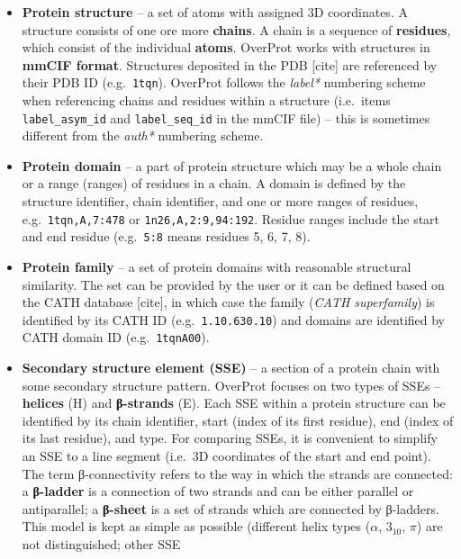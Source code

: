 \documentclass[12pt,draft]{article}
\let\oldtexttt\texttt
\renewcommand{\texttt}[1]{\textcolor{CodeColor}{\oldtexttt{#1}}}
\begin{document}
\begin{itemize}
\item
  \textbf{Protein structure} -- a set of atoms with assigned 3D
  coordinates. A structure consists of one ore more \textbf{chains}. A
  chain is a sequence of \textbf{residues}, which consist of the
  individual \textbf{atoms}. OverProt works with structures in
  \textbf{mmCIF format}. Structures deposited in the PDB {[}cite{]} are
  referenced by their PDB ID (e.g.~\texttt{1tqn}). OverProt follows the
  \emph{label*} numbering scheme when referencing chains and residues
  within a structure (i.e.~items \texttt{label\_asym\_id} and
  \texttt{label\_seq\_id} in the mmCIF file) -- this is sometimes
  different from the \emph{auth*} numbering scheme.
\item
  \textbf{Protein domain} -- a part of protein structure which may be a
  whole chain or a range (ranges) of residues in a chain. A domain is
  defined by the structure identifier, chain identifier, and one or more
  ranges of residues, e.g.~\texttt{1tqn,A,7:478} or
  \texttt{1n26,A,2:9,94:192}. Residue ranges include the start and end
  residue (e.g.~\texttt{5:8} means residues 5, 6, 7, 8).
\item
  \textbf{Protein family} -- a set of protein domains with reasonable
  structural similarity. The set can be provided by the user or it can
  be defined based on the CATH database {[}cite{]}, in which case the
  family (\emph{CATH superfamily}) is identified by its CATH ID
  (e.g.~\texttt{1.10.630.10}) and domains are identified by CATH domain
  ID (e.g.~\texttt{1tqnA00}).
\item
  \textbf{Secondary structure element (SSE)} -- a section of a protein
  chain with some secondary structure pattern. OverProt focuses on two
  types of SSEs -- \textbf{helices} (H) and \textbf{β-strands} (E). Each
  SSE within a protein structure can be identified by its chain
  identifier, start (index of its first residue), end (index of its last
  residue), and type. For comparing SSEs, it is convenient to simplify
  an SSE to a line segment (i.e.~3D coordinates of the start and end
  point).\\
  The term β-connectivity refers to the way in which the strands are
  connected: a \textbf{β-ladder} is a connection of two strands and can
  be either parallel or antiparallel; a \textbf{β-sheet} is a set of
  strands which are connected by β-ladders.\\
  This model is kept as simple as possible (different helix types
  (\(\alpha\), \(3_{10}\), \(\pi\)) are not distinguished; other SSE

\end{itemize}
\end{document}

